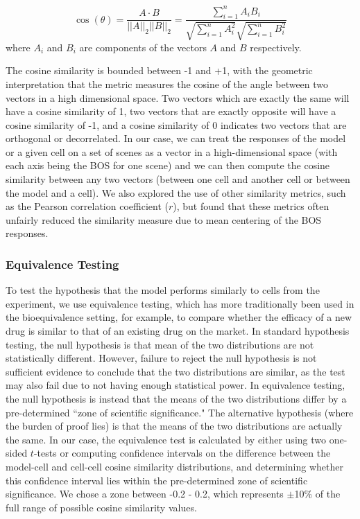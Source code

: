 \begin{equation}
\cos(\theta) = \frac{A \cdot B}{||A||_{2}||B||_{2}} = \frac{\sum\limits_{i=1}^{n}A_{i}B_{i}}{\sqrt{\sum\limits_{i=1}^{n}A_{i}^2}\sqrt{\sum\limits_{i=1}^{n}B_{i}^2}}
\label{eq:cos_sim}
\end{equation}
where $A_i$ and $B_i$ are components of the vectors $A$ and $B$ respectively.

The cosine similarity is bounded between -1 and +1, with the geometric interpretation that the metric measures the cosine of the angle between two vectors in a high dimensional space. Two vectors which are exactly the same will have a cosine similarity of 1, two vectors that are exactly opposite will have a cosine similarity of -1, and a cosine similarity of 0 indicates two vectors that are orthogonal or decorrelated. In our case, we can treat the responses of the model or a given cell on a set of scenes as a vector in a high-dimensional space (with each axis being the BOS for one scene) and we can then compute the cosine similarity between any two vectors (\eg between one cell and another cell or between the model and a cell). We also explored the use of other similarity metrics, such as the Pearson correlation coefficient ($r$), but found that these metrics often unfairly reduced the similarity measure due to mean centering of the BOS responses.

\subsubsection{Equivalence Testing}
To test the hypothesis that the model performs similarly to cells from the experiment, we use equivalence testing, which has more traditionally been used in the bioequivalence setting, for example, to compare whether the efficacy of a new drug is similar to that of an existing drug on the market. In standard hypothesis testing, the null hypothesis is that mean of the two distributions are not statistically different. However, failure to reject the null hypothesis is not sufficient evidence to conclude that the two distributions are similar, as the test may also fail due to not having enough statistical power. In equivalence testing, the null hypothesis is instead that the means of the two distributions differ by a pre-determined ``zone of scientific significance." The alternative hypothesis (where the burden of proof lies) is that the means of the two distributions are actually the same. In our case, the equivalence test is calculated by either using two one-sided $t$-tests or computing confidence intervals on the difference between the model-cell and cell-cell cosine similarity distributions, and determining whether this confidence interval lies within the pre-determined zone of scientific significance. We chose a zone between -0.2 - 0.2, which represents $\pm$10\% of the full range of possible cosine similarity values.

